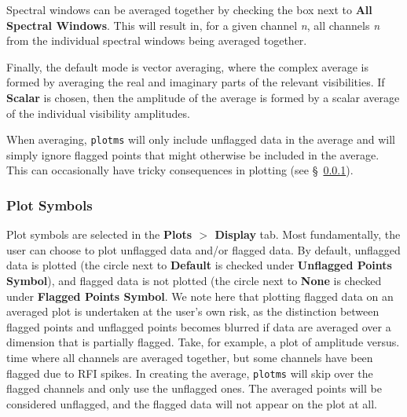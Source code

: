Spectral windows can be averaged together by checking the box next to {\bf All Spectral Windows}. This will result in, for a given channel {\it n}, all channels {\it n} from the individual spectral windows being averaged together. 

Finally, the default mode is vector averaging, where the complex average is formed by averaging the real and imaginary parts of the relevant visibilities.  If {\bf Scalar} is chosen, then the amplitude of the average is formed by a scalar average of the individual visibility amplitudes.

When averaging, {\tt plotms} will only include unflagged data in the average and will simply ignore flagged points that might otherwise be included in the average. This can occasionally have tricky consequences in plotting (see \S~\ref{section:edit.plot.plotms.symbol}).


\subsubsection{Plot Symbols}
\label{section:edit.plot.plotms.symbol}

Plot symbols are selected in the {\bf Plots $>$ Display} tab. Most fundamentally, the user can choose to plot unflagged data and/or flagged data. By default, unflagged data is plotted (the circle next to {\bf Default} is checked under {\bf Unflagged Points Symbol}), and flagged data is not plotted (the circle next to {\bf None} is checked under {\bf Flagged Points Symbol}. We note here that plotting flagged data on an averaged plot is undertaken at the user's own risk, as the distinction between flagged points and unflagged points becomes blurred if data are averaged over a dimension that is partially flagged. Take, for example, a plot of amplitude versus. time where all channels are averaged together, but some channels have been flagged due to RFI spikes. In creating the average, {\tt plotms} will skip over the flagged channels and only use the unflagged ones. The averaged points will be considered unflagged, and the flagged data will not appear on the plot at all.

